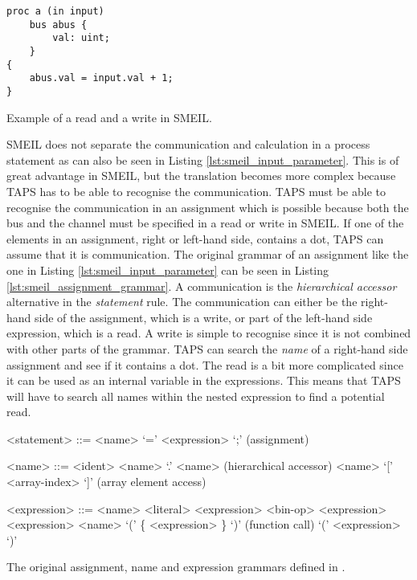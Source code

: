 \begin{listing}
\begin{verbatim}
proc a (in input)
    bus abus {
        val: uint;
    }
{
    abus.val = input.val + 1;
}
\end{verbatim}
\caption{Example of a read and a write in SMEIL.}
\label{lst:smeil_input_parameter}
\end{listing}
SMEIL does not separate the communication and calculation in a process statement as can also be seen in Listing \ref{lst:smeil_input_parameter}. This is of great advantage in SMEIL, but the translation becomes more complex because TAPS has to be able to recognise the communication.
TAPS must be able to recognise the communication in an assignment which is possible because both the bus and the channel must be specified in a read or write in SMEIL. If one of the elements in an assignment, right or left-hand side, contains a dot, TAPS can assume that it is communication. The original grammar of an assignment like the one in Listing \ref{lst:smeil_input_parameter} can be seen in Listing \ref{lst:smeil_assignment_grammar}. A communication is the \textit{hierarchical accessor} alternative in the \textit{statement} rule. The communication can either be the right-hand side of the assignment, which is a write, or part of the left-hand side expression, which is a read. A write is simple to recognise since it is not combined with other parts of the grammar. TAPS can search the \textit{name} of a right-hand side assignment and see if it contains a dot. The read is a bit more complicated since it can be used as an internal variable in the expressions. This means that TAPS will have to search all names within the nested expression to find a potential read.
\begin{listing}
\begin{grammar}
<statement> ::= <name> `=' <expression> `;' (assignment)

<name> ::= <ident>
\alt <name> `.' <name> (hierarchical accessor)
\alt <name> `[' <array-index> `]' (array element access)

<expression> ::= <name>
\alt <literal>
\alt <expression> <bin-op> <expression>
 <expression>
\alt <name> `(' \{ <expression> \}  `)' (function call)
\alt `(' <expression> `)'


\end{grammar}
\caption{The original assignment, name and expression grammars defined in \cite{Asheim2018}.}
\label{lst:smeil_assignment_grammar}
\end{listing}
